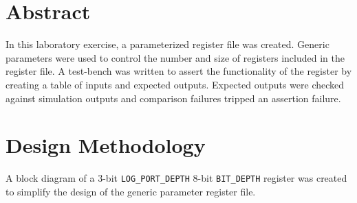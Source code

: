 \documentclass[CMPE]{../KGCOEReport}
\def\code#1{\texttt{#1}}
\begin{document}
    \maketitle
    \section*{Abstract}

    In this laboratory exercise, a parameterized register file was created.
    Generic parameters were used to control the number and size of registers
    included in the register file.
    A test-bench was written to assert the functionality of the register by
    creating a table of inputs and expected outputs.
    Expected outputs were checked against simulation outputs and comparison
    failures tripped an assertion failure.

    \section*{Design Methodology}

    A block diagram of a 3-bit \code{LOG\_PORT\_DEPTH} 8-bit \code{BIT\_DEPTH}
    register was created to simplify the design of the generic parameter
    register file.
\end{document}
